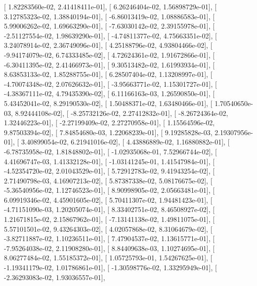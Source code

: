 \documentclass{article}
\begin{document}
       [  1.82283560e-02,   2.41418411e-01],
       [  6.26246404e-02,   1.56898729e-01],
       [  3.12785323e-02,   1.38840194e-01],
       [ -6.86013419e-02,   1.08886583e-01],
       [  5.99006262e-02,   1.69663290e-01],
       [ -7.63030142e-02,   2.39155978e-01],
       [ -2.51127554e-02,   1.98639290e-01],
       [ -4.74811377e-02,   4.75663351e-02],
       [  3.24078914e-02,   2.36749096e-01],
       [  4.25188796e-02,   4.93804466e-02],
       [ -9.94174079e-02,   6.74333485e-02],
       [  4.72624361e-02,   1.91672866e-01],
       [ -6.30411395e-02,   2.41466973e-01],
       [  9.30513482e-02,   1.61993934e-01],
       [  8.63853133e-02,   1.85288755e-01],
       [  6.28507404e-02,   1.13208997e-01],
       [ -4.70074348e-02,   2.07626632e-01],
       [ -3.95663771e-02,   1.15301727e-01],
       [ -4.38367111e-02,   4.79435390e-02],
       [  6.11166163e-03,   1.26590850e-01],
       [  5.43452041e-02,   8.29190530e-02],
       [  1.50488371e-02,   1.63480466e-01],
       [  1.70540650e-03,   8.92444108e-02],
       [ -8.25732126e-02,   2.27412832e-01],
       [ -8.26724364e-02,   1.32446223e-01],
       [ -2.27199409e-02,   2.27270958e-01],
       [  1.15564596e-02,   9.87503394e-02],
       [  7.84854680e-03,   1.22068239e-01],
       [  9.19285828e-03,   2.19307956e-01],
       [  3.40899054e-02,   6.21941016e-02],
       [  4.43886889e-02,   1.16880882e-01],
       [ -6.78735958e-02,   1.81848802e-01],
       [ -1.02935068e-01,   7.52966744e-02],
       [  4.41696747e-03,   1.41332128e-01],
       [ -1.03141245e-01,   1.41547984e-01],
       [ -4.52354720e-02,   2.01043529e-01],
       [  5.72912783e-02,   9.41943254e-02],
       [  2.71490798e-03,   4.16907213e-02],
       [  5.87387338e-02,   5.08176675e-02],
       [ -5.36540956e-02,   1.12746523e-01],
       [  8.90998905e-02,   2.05663481e-01],
       [  6.09919346e-02,   4.45901605e-02],
       [  5.70411307e-02,   1.94481423e-01],
       [ -4.71151090e-03,   1.20205074e-01],
       [  8.33402751e-02,   8.46508927e-02],
       [  1.21671815e-02,   2.15867962e-01],
       [ -7.13141138e-02,   1.49811075e-01],
       [  5.57101501e-02,   9.43264303e-02],
       [  4.02057868e-02,   8.31064679e-02],
       [ -3.82711887e-02,   1.10236511e-01],
       [  7.47904537e-02,   1.13615771e-01],
       [ -7.95264038e-02,   2.11908280e-01],
       [  8.84409638e-03,   1.10274695e-01],
       [  8.06277484e-02,   1.55185372e-01],
       [  1.05725793e-01,   1.54267625e-01],
       [ -1.19341179e-02,   1.01786861e-01],
       [ -1.30598776e-02,   1.33295949e-01],
       [ -2.36293083e-02,   1.93036557e-01],
\end{document}
